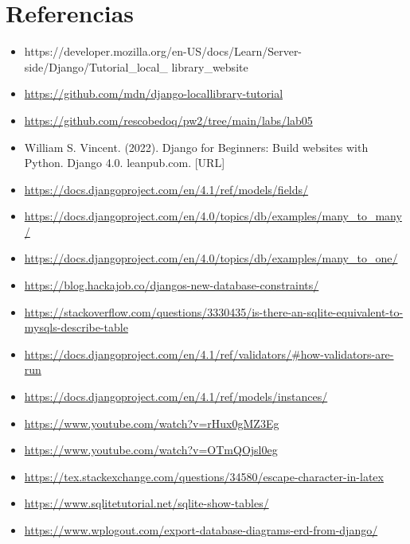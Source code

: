 \documentclass{article}
\begin{document}
\clearpage

\section{Referencias}
\begin{itemize}			
    \item {https://developer.mozilla.org/en-US/docs/Learn/Server-side/Django/Tutorial_local_
library_website}
    \item \url{https://github.com/mdn/django-locallibrary-tutorial}
    \item \url{https://github.com/rescobedoq/pw2/tree/main/labs/lab05}
    \item William S. Vincent. (2022). Django for Beginners: Build websites with Python. Django 4.0.
leanpub.com. [URL]
    \item \url{https://docs.djangoproject.com/en/4.1/ref/models/fields/}
    \item \url{https://docs.djangoproject.com/en/4.0/topics/db/examples/many_to_many/}
    \item \url{https://docs.djangoproject.com/en/4.0/topics/db/examples/many_to_one/}
    \item \url{https://blog.hackajob.co/djangos-new-database-constraints/}
    \item \url{https://stackoverflow.com/questions/3330435/is-there-an-sqlite-equivalent-to-mysqls-describe-table}
    \item \url{https://docs.djangoproject.com/en/4.1/ref/validators/#how-validators-are-run}
    \item \url{https://docs.djangoproject.com/en/4.1/ref/models/instances/}
    \item \url{https://www.youtube.com/watch?v=rHux0gMZ3Eg}
    \item \url{https://www.youtube.com/watch?v=OTmQOjsl0eg}
    \item \url{https://tex.stackexchange.com/questions/34580/escape-character-in-latex}
    \item \url{https://www.sqlitetutorial.net/sqlite-show-tables/}
    \item \url{https://www.wplogout.com/export-database-diagrams-erd-from-django/}
\end{itemize}	
	
%
%
%
			
\end{document}
